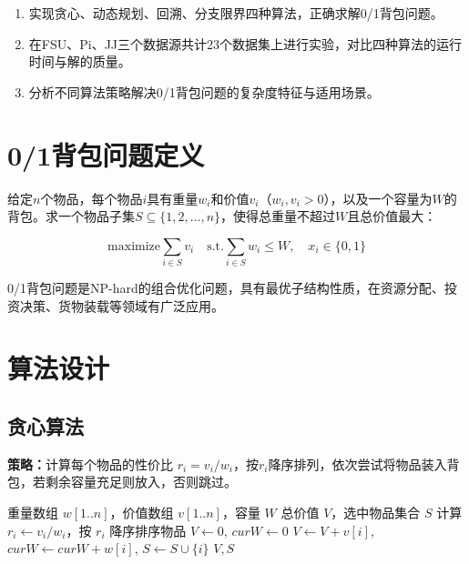 \documentclass[6pt,a4paper]{ctexart}
\begin{document}
\begin{enumerate}[leftmargin=2.5em,itemsep=0.25em]
  \item 实现贪心、动态规划、回溯、分支限界四种算法，正确求解0/1背包问题。
  \item 在FSU、Pi、JJ三个数据源共计23个数据集上进行实验，对比四种算法的运行时间与解的质量。
  \item 分析不同算法策略解决0/1背包问题的复杂度特征与适用场景。
\end{enumerate}


\section{0/1背包问题定义}

给定$n$个物品，每个物品$i$具有重量$w_i$和价值$v_i$（$w_i, v_i > 0$），以及一个容量为$W$的背包。求一个物品子集$S \subseteq \{1, 2, \dots, n\}$，使得总重量不超过$W$且总价值最大：

\begin{equation}
\text{maximize} \sum_{i \in S} v_i \quad \text{s.t.} \sum_{i \in S} w_i \leq W,\quad x_i \in \{0, 1\}
\end{equation}

0/1背包问题是NP-hard的组合优化问题，具有最优子结构性质，在资源分配、投资决策、货物装载等领域有广泛应用。


\section{算法设计}

\subsection{贪心算法}

\textbf{策略：}计算每个物品的性价比 $r_i = v_i / w_i$，按$r_i$降序排列，依次尝试将物品装入背包，若剩余容量充足则放入，否则跳过。

\begin{algorithm}[ht]
\caption{贪心算法求解0/1背包}
\begin{algorithmic}[1]
\Require 重量数组 $w[1..n]$，价值数组 $v[1..n]$，容量 $W$
\Ensure 总价值 $V$，选中物品集合 $S$
\State 计算 $r_i \gets v_i / w_i$，按 $r_i$ 降序排序物品
\State $V \gets 0$, $curW \gets 0$
        \State $V \gets V + v[i]$, $curW \gets curW + w[i]$, $S \gets S \cup \{i\}$
    \EndIf
\EndFor
\State \Return $V, S$
\end{algorithmic}
\end{algorithm}
\end{document}
